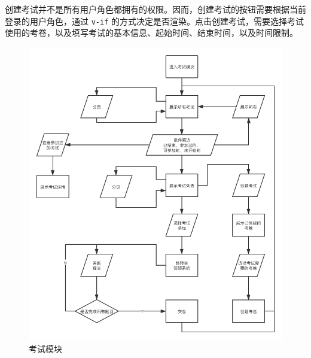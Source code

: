 创建考试并不是所有用户角色都拥有的权限。因而，创建考试的按钮需要根据当前登录的用户角色，通过 
\lstinline!v-if! 的方式决定是否渲染。点击创建考试，需要选择考试使用的考卷，以及填写考试的基本信息、起始时间、结束时间，以及时间限制。

\begin{figure}[htb]
    \centering
    \includegraphics[width=\linewidth]{_images/考试模块.png}
    \caption{考试模块}
\end{figure}


